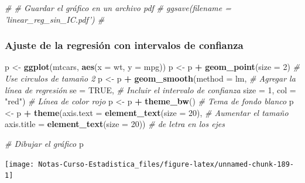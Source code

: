 \documentclass[
  12pt,
]{book}
\newenvironment{Shaded}{\begin{snugshade}}{\end{snugshade}}
\newcommand{\CommentTok}[1]{\textcolor[rgb]{0.56,0.35,0.01}{\textit{#1}}}
\newcommand{\DataTypeTok}[1]{\textcolor[rgb]{0.13,0.29,0.53}{#1}}
\newcommand{\DecValTok}[1]{\textcolor[rgb]{0.00,0.00,0.81}{#1}}
\newcommand{\KeywordTok}[1]{\textcolor[rgb]{0.13,0.29,0.53}{\textbf{#1}}}
\newcommand{\NormalTok}[1]{#1}
\newcommand{\OperatorTok}[1]{\textcolor[rgb]{0.81,0.36,0.00}{\textbf{#1}}}
\newcommand{\OtherTok}[1]{\textcolor[rgb]{0.56,0.35,0.01}{#1}}
\newcommand{\StringTok}[1]{\textcolor[rgb]{0.31,0.60,0.02}{#1}}
\theoremstyle{definition}
\theoremstyle{definition}
\theoremstyle{definition}
\theoremstyle{remark}
\begin{document}
\begin{Shaded}
\begin{Highlighting}[]
\CommentTok{# # Guardar el gráfico en un archivo pdf}
\CommentTok{# ggsave(filename = 'linear_reg_sin_IC.pdf') # }
\end{Highlighting}
\end{Shaded}

\hypertarget{ajuste-de-la-regresiuxf3n-con-intervalos-de-confianza}{%
\subsubsection{Ajuste de la regresión con intervalos de confianza}\label{ajuste-de-la-regresiuxf3n-con-intervalos-de-confianza}}

\begin{Shaded}
\begin{Highlighting}[]
\NormalTok{p <-}\StringTok{ }\KeywordTok{ggplot}\NormalTok{(mtcars, }\KeywordTok{aes}\NormalTok{(}\DataTypeTok{x =}\NormalTok{ wt, }\DataTypeTok{y =}\NormalTok{ mpg)) }
\NormalTok{p <-}\StringTok{ }\NormalTok{p }\OperatorTok{+}\StringTok{ }\KeywordTok{geom_point}\NormalTok{(}\DataTypeTok{size =} \DecValTok{2}\NormalTok{)       }\CommentTok{# Use circulos de tamaño 2}
\NormalTok{p <-}\StringTok{ }\NormalTok{p }\OperatorTok{+}\StringTok{ }\KeywordTok{geom_smooth}\NormalTok{(}\DataTypeTok{method =}\NormalTok{ lm,   }\CommentTok{# Agregar la línea de regresión }
              \DataTypeTok{se =} \OtherTok{TRUE}\NormalTok{,            }\CommentTok{# Incluir el intervalo de confianza   }
              \DataTypeTok{size =} \DecValTok{1}\NormalTok{,}
              \DataTypeTok{col =} \StringTok{"red"}\NormalTok{)          }\CommentTok{# Línea de color rojo }
\NormalTok{p <-}\StringTok{ }\NormalTok{p }\OperatorTok{+}\StringTok{ }\KeywordTok{theme_bw}\NormalTok{()                 }\CommentTok{# Tema de fondo blanco}
\NormalTok{p <-}\StringTok{ }\NormalTok{p }\OperatorTok{+}\StringTok{ }\KeywordTok{theme}\NormalTok{(}\DataTypeTok{axis.text =} \KeywordTok{element_text}\NormalTok{(}\DataTypeTok{size =} \DecValTok{20}\NormalTok{),  }\CommentTok{# Aumentar el tamaño }
               \DataTypeTok{axis.title =} \KeywordTok{element_text}\NormalTok{(}\DataTypeTok{size =} \DecValTok{20}\NormalTok{)) }\CommentTok{# de letra en los ejes}

\CommentTok{# Dibujar el gráfico}
\NormalTok{p   }
\end{Highlighting}
\end{Shaded}

\begin{center}\texttt{[image: Notas-Curso-Estadistica\_files/figure-latex/unnamed-chunk-189-1]} \end{center}
\end{document}
